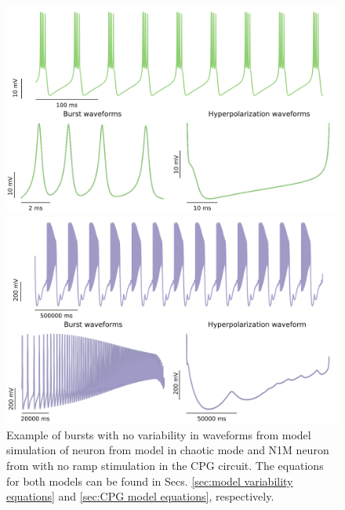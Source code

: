 \begin{figure}[hbt]
	\centering
	\begin{minipage}{0.48\textwidth}
		\includegraphics[width=\textwidth]{img/invariants/variability/GHmodel.png}
	\end{minipage}
	\begin{minipage}{0.48\textwidth}
		\includegraphics[width=\textwidth]{img/invariants/variability/N1Mnovar.png}
	\end{minipage}
	\caption{Example of bursts with no variability in waveforms from model simulation of neuron from \textcite{ghigliazza_minimal_2004b} model in chaotic mode and N1M neuron from \textcite{vavoulis_dynamic_2007} with no ramp stimulation in the CPG circuit. The equations for both models can be found in Secs. \ref{sec:model variability equations} and \ref{sec:CPG model equations}, respectively.}
	\label{fig:model burst no variability}
\end{figure}



